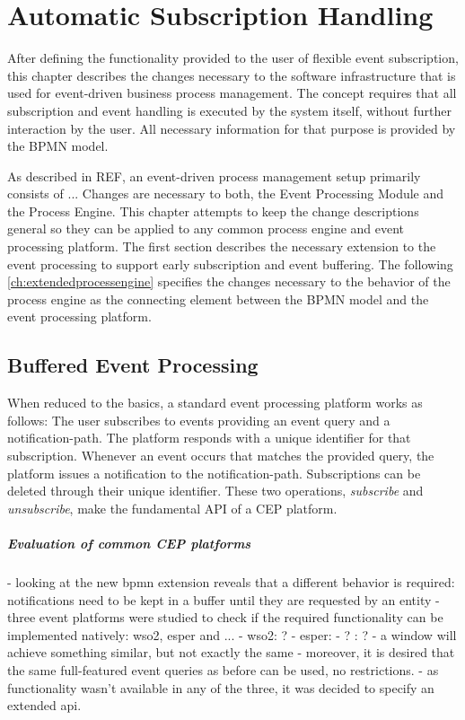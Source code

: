 \chapter{Automatic Subscription Handling}\label{ch:automaticsubscription}

After defining the functionality provided to the user of flexible event subscription, this chapter describes the changes necessary to the software infrastructure that is used for event-driven business process management.
The concept requires that all subscription and event handling is executed by the system itself, without further interaction by the user.
All necessary information for that purpose is provided by the BPMN model.

As described in REF, an event-driven process management setup primarily consists of ...
Changes are necessary to both, the Event Processing Module and the Process Engine. This chapter attempts to keep the change descriptions general so they can be applied to any common process engine and event processing platform.
The first section describes the necessary extension to the event processing to support early subscription and event buffering.
The following \autoref{ch:extendedprocessengine} specifies the changes necessary to the behavior of the process engine as the connecting element between the BPMN model and the event processing platform.


\section{Buffered Event Processing}
When reduced to the basics, a standard event processing platform works as follows: The user subscribes to events providing an event query and a notification-path. The platform responds with a unique identifier for that subscription.
Whenever an event occurs that matches the provided query, the platform issues a notification to the notification-path. Subscriptions can be deleted through their unique identifier.
These two operations, \textit{subscribe} and \textit{unsubscribe}, make the fundamental API of a CEP platform.


\paragraph{Evaluation of common CEP platforms}
- looking at the new bpmn extension reveals that a different behavior is required: notifications need to be kept in a buffer until they are requested by an entity
- three event platforms were studied to check if the required functionality can be implemented natively: wso2, esper and ...
- wso2: ?
- esper: 
- ? : ?
- a window will achieve something similar, but not exactly the same
- moreover, it is desired that the same full-featured event queries as before can be used, no restrictions. 
- as functionality wasn't available in any of the three, it was decided to specify an extended api.

